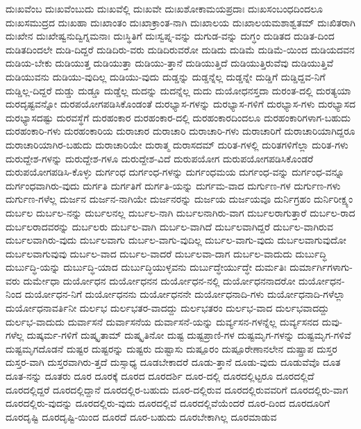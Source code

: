 {ದುಃಖವೆಂಬ
ದುಃಖವೆಂಬುದು
ದುಃಖವೆಲ್ಲಿ
ದುಃಖವೇ
ದುಃಖಶೋಕಾಮಯಪ್ರದಾಃ
ದುಃಖಸಂಬಂಧದಿಂದಲೂ
ದುಃಖಸಮುದ್ರದ
ದುಃಖಹಾ
ದುಃಖಾಂತಂ
ದುಃಖಾಕ್ರಾಂತ-ನಾಗಿ
ದುಃಖಾಲಯ
ದುಃಖಾಲಯಮಶಾಶ್ವತಮ್
ದುಃಖಿತರಾಗಿ
ದುಃಖೇನ
ದುಃಖೇಷ್ವನುದ್ವಿಗ್ನಮನಾಃ
ದುಃಸ್ಥಿತಿಗೆ
ದುಃಸ್ವಪ್ನ-ವನ್ನು
ದುಗುಡ-ವನ್ನು
ದುಗ್ಧಂ
ದುಡಿತದ
ದುಡಿತ-ದಿಂದ
ದುಡಿತದಿಂದಲೇ
ದುಡಿ-ದಿದ್ದರೆ
ದುಡಿದಿರು-ವರು
ದುಡಿದಿರುವರೋ
ದುಡಿದು
ದುಡಿಮೆ
ದುಡಿಮೆ-ಯಿಂದ
ದುಡಿಯದವನ
ದುಡಿಯ-ಬೇಕು
ದುಡಿಯುತ್ತ
ದುಡಿಯುತ್ತಾ
ದುಡಿಯು-ತ್ತಾನೆ
ದುಡಿಯುತ್ತಿದೆ
ದುಡಿಯುತ್ತಿರುವೆವು
ದುಡಿಯುತ್ತಿವೆ
ದುಡಿಯುವನು
ದುಡಿಯು-ವುದಿಲ್ಲ
ದುಡಿಯು-ವುದು
ದುಡ್ಡನ್ನು
ದುಡ್ಡನ್ನೆಲ್ಲ
ದುಡ್ಡನ್ನೇ
ದುಡ್ಡಿಗೆ
ದುಡ್ಡಿದ್ದವ-ನಿಗೆ
ದುಡ್ಡಿಲ್ಲ-ದಿದ್ದರೆ
ದುಡ್ಡು
ದುಡ್ಡೂ
ದುಡ್ಡೆಲ್ಲ
ದುದನ್ನು
ದುದನ್ನೆಲ್ಲ
ದುದು
ದುಯೋಧನಸ್ತದಾ
ದುರಂತ-ದಲ್ಲಿ
ದುರತ್ಯಯಾ
ದುರದೃಷ್ಟವನ್ನೋ
ದುರಪಯೋಗಪಡಿಸಿಕೊಂಡಂತೆ
ದುರಭ್ಯಾಸ-ಗಳನ್ನು
ದುರಭ್ಯಾಸ-ಗಳಿಗೆ
ದುರಭ್ಯಾಸ-ಗಳು
ದುರಭ್ಯಾಸದ
ದುರಭ್ಯಾಸದಷ್ಟು
ದುರವಸ್ಥೆಗೆ
ದುರಹಂಕಾರ
ದುರಹಂಕಾರ-ದಲ್ಲಿ
ದುರಹಂಕಾರದಿಂದಲೂ
ದುರಹಂಕಾರಿಗಳಾಗ-ಬಹುದು
ದುರಹಂಕಾರಿ-ಗಳು
ದುರಹಂಕಾರಿಯ
ದುರಾಚಾರ
ದುರಾಚಾರಿ
ದುರಾಚಾರಿ-ಗಳು
ದುರಾಚಾರಿಗೆ
ದುರಾಚಾರಿಯಾಗಿದ್ದರೂ
ದುರಾಚಾರಿಯಾಗಿರ-ಬಹುದು
ದುರಾಚಾರಿಯೇ
ದುರಾತ್ಮ
ದುರಾಸದಮ್
ದುರಿತ-ಗಳಲ್ಲಿ
ದುರಿತಗಳಿಗೆಲ್ಲಾ
ದುರಿತ-ಗಳು
ದುರುದ್ದೇಶ-ಗಳನ್ನು
ದುರುದ್ದೇಶ-ಗಳೂ
ದುರುದ್ದೇಶ-ವಿದೆ
ದುರುಪಯೋಗ
ದುರುಪಯೋಗಪಡಿಸಿಕೊಂಡರೆ
ದುರುಪಯೋಗಪಡಿಸಿ-ಕೊಳ್ಳು
ದುರ್ಗಂಧ
ದುರ್ಗಂಧ-ಗಳನ್ನು
ದುರ್ಗಂಧಮಯ
ದುರ್ಗಂಧ-ವನ್ನು
ದುರ್ಗಂಧ-ವನ್ನೂ
ದುರ್ಗಂಧವಾಗಿರು-ವುದು
ದುರ್ಗತಿ
ದುರ್ಗತಿಗೆ
ದುರ್ಗತಿ-ಯನ್ನು
ದುರ್ಗಮ-ವಾದ
ದುರ್ಗುಣ-ಗಳ
ದುರ್ಗುಣ-ಗಳು
ದುರ್ಗುಣ-ಗಳೆಲ್ಲ
ದುರ್ಜನ
ದುರ್ಜನ-ನಾಗಿಯೇ
ದುರ್ಜನರನ್ನು
ದುರ್ಜಯ
ದುರ್ಜಯವೂ
ದುರ್ನಿಗ್ರಹಂ
ದುರ್ನಿರೀಕ್ಷ್ಯಂ
ದುರ್ಬಲ
ದುರ್ಬಲ-ನನ್ನು
ದುರ್ಬಲನಲ್ಲ
ದುರ್ಬಲ-ನಾಗಿ
ದುರ್ಬಲನಾಗಿರು-ವಾಗ
ದುರ್ಬಲರಾಗುತ್ತಾರೆ
ದುರ್ಬಲ-ರಾದ
ದುರ್ಬಲರಾದವರನ್ನು
ದುರ್ಬಲರು
ದುರ್ಬಲ-ವಾಗಿ
ದುರ್ಬಲ-ವಾಗಿದೆ
ದುರ್ಬಲವಾಗಿದ್ದರೆ
ದುರ್ಬಲ-ವಾಗಿರುವ
ದುರ್ಬಲವಾಗಿರು-ವುದು
ದುರ್ಬಲವಾಗು
ದುರ್ಬಲ-ವಾಗು-ವುದಿಲ್ಲ
ದುರ್ಬಲ-ವಾಗು-ವುದು
ದುರ್ಬಲವಾಗುವುದೋ
ದುರ್ಬಲವಾಗುವುವು
ದುರ್ಬಲ-ವಾದ
ದುರ್ಬಲ-ವಾದರೆ
ದುರ್ಬಲವಾ-ದಾಗ
ದುರ್ಬಲ-ವಾದುದು
ದುರ್ಬುದ್ಧಿ
ದುರ್ಬುದ್ಧಿ-ಯನ್ನು
ದುರ್ಬುದ್ಧಿ-ಯಾದ
ದುರ್ಬುದ್ಧಿಯುಳ್ಳವನು
ದುರ್ಬುದ್ಧೇರ್ಯುದ್ಧೇ
ದುರ್ಮತಿಃ
ದುರ್ಮಾರ್ಗಿಗಳಾಗು-ವರು
ದುರ್ಮೇಧಾ
ದುರ್ಯೋಧನ
ದುರ್ಯೋಧನನ
ದುರ್ಯೋಧನ-ನಲ್ಲಿ
ದುರ್ಯೋಧನನಾದರೋ
ದುರ್ಯೋಧನ-ನಿಂದ
ದುರ್ಯೋಧನ-ನಿಗೆ
ದುರ್ಯೋಧನನು
ದುರ್ಯೋಧನನೇ
ದುರ್ಯೋಧನಾದಿ-ಗಳು
ದುರ್ಯೋಧನಾದಿ-ಗಳೆಲ್ಲಾ
ದುರ್ಯೋಧನಾವರ್ತಿನೀ
ದುರ್ಲಭ
ದುರ್ಲಭತರ-ವಾದದ್ದು
ದುರ್ಲಭತರಂ
ದುರ್ಲಭ-ವಾದ
ದುರ್ಲಭವಾದದ್ದು
ದುರ್ಲಭ-ವಾದುದು
ದುರ್ವಾಸನೆ
ದುರ್ವಾಸನೆಯ
ದುರ್ವಾಸನೆ-ಯನ್ನು
ದುರ್ವ್ಯಸನ-ಗಳನ್ನೆಲ್ಲ
ದುರ್ವ್ಯಸನದ
ದುವು-ಗಳೆಲ್ಲ
ದುಷ್ಕರ್ಮ-ಗಳಿಗೆ
ದುಷ್ಕೃತಾಮ್
ದುಷ್ಕೃತಿನೋ
ದುಷ್ಟ
ದುಷ್ಟಪ್ರಾಣಿ-ಗಳ
ದುಷ್ಟಮೃಗ-ಗಳನ್ನು
ದುಷ್ಟಮೃಗ-ಗಳಿವೆ
ದುಷ್ಟಮೃಗದೊಡನೆ
ದುಷ್ಟರ
ದುಷ್ಟರನ್ನು
ದುಷ್ಟರು
ದುಷ್ಟಾಸು
ದುಷ್ಪೂರಂ
ದುಷ್ಪೂರೇಣಾನಲೇನ
ದುಷ್ಪ್ರಾಪ
ದುಸ್ತರ
ದುಸ್ತರ-ವಾಗಿ
ದುಸ್ತರವಾಗಿರು-ತ್ತದೆ
ದುಸ್ಸಾಧ್ಯ
ದೂಡಬೇಕಾದರೆ
ದೂಡು-ತ್ತಾನೆ
ದೂಡು-ವುದು
ದೂಡುವೆವೊ
ದೂತ
ದೂತ-ನನ್ನು
ದೂತರು
ದೂರ
ದೂರಕ್ಕೆ
ದೂರದ
ದೂರದರ್ಶಿ
ದೂರ-ದಲ್ಲಿ
ದೂರದಲ್ಲಿಟ್ಟರೂ
ದೂರದಲ್ಲಿದೆ
ದೂರದಲ್ಲಿದ್ದರೆ
ದೂರದಲ್ಲಿದ್ದಾನೆ
ದೂರದಲ್ಲಿರ-ಬಹುದು
ದೂರ-ದಲ್ಲಿರುವ
ದೂರದಲ್ಲಿರುವವರಿಗೆ
ದೂರದಲ್ಲಿರು-ವಾಗ
ದೂರದಲ್ಲಿರು-ವುದನ್ನು
ದೂರದಲ್ಲಿರು-ವುದು
ದೂರದಲ್ಲಿವೆ
ದೂರದಲ್ಲಿವೆಯೆಂದರೆ
ದೂರ-ದಿಂದ
ದೂರದೂರಿಗೆ
ದೂರದೃಷ್ಟಿ
ದೂರದೃಷ್ಟಿ-ಯಿಂದ
ದೂರದೆ
ದೂರ-ಬಹುದು
ದೂರಬೇಕಾಗಿಲ್ಲ
ದೂರಮಾಡುವ
}
